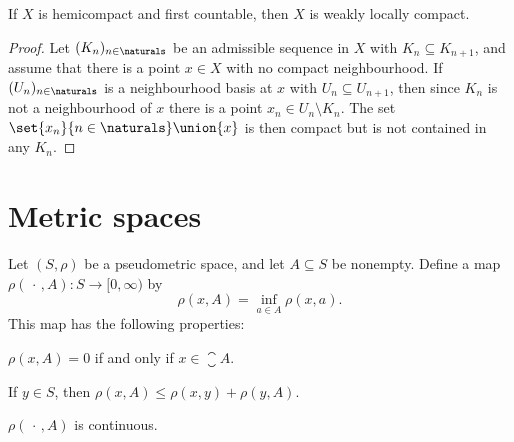 \documentclass[article, a4paper, 11pt, oneside]{memoir}
\numberwithin{equation}{chapter}
\begin{document}
\begin{proposition}
    If $X$ is hemicompact and first countable, then $X$ is weakly locally compact.
\end{proposition}

\begin{proof}
    Let $(K_n)_{n \in \naturals}$ be an admissible sequence in $X$ with $K_n \subseteq K_{n+1}$, and assume that there is a point $x \in X$ with no compact neighbourhood. If $(U_n)_{n \in \naturals}$ is a neighbourhood basis at $x$ with $U_n \subseteq U_{n+1}$, then since $K_n$ is not a neighbourhood of $x$ there is a point $x_n \in U_n \setminus K_n$. The set $\set{x_n}{n \in \naturals} \union \{x\}$ is then compact but is not contained in any $K_n$.
\end{proof}



\section{Metric spaces}

\begin{lemma}
    \label{thm:distance-to-set}
    Let $(S,\rho)$ be a pseudometric space, and let $A \subseteq S$ be nonempty. Define a map $\rho(\,\cdot\,, A) \colon S \to [0, \infty)$ by
    \begin{equation*}
        \rho(x, A) = \inf_{a \in A} \rho(x,a).
    \end{equation*}
    This map has the following properties:
    \begin{enumlem}
        \item \label{enum:distance-to-set-closure} $\rho(x,A) = 0$ if and only if $x \in \closure{A}$.

        \item \label{enum:distance-to-set-triangle-inequality} If $y \in S$, then $\rho(x,A) \leq \rho(x,y) + \rho(y,A)$.

        \item \label{enum:distance-to-set-continuous} $\rho(\,\cdot\,, A)$ is continuous.
    \end{enumlem}
\end{lemma}
\end{document}

